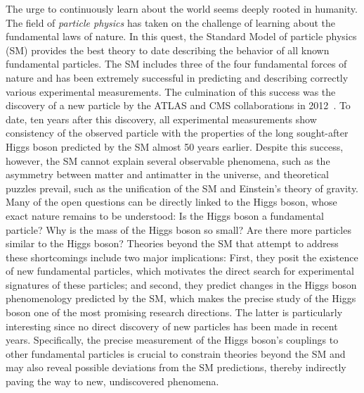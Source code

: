 
The urge to continuously learn about the world seems deeply rooted in humanity.
The field of \emph{particle physics} has taken on the challenge of learning about the fundamental laws of nature. 
In this quest, the Standard Model of particle physics (SM) provides the best theory to date describing the behavior of all known fundamental particles. 
The SM includes three of the four fundamental forces of nature and has been extremely successful in predicting and describing correctly various experimental measurements. 
The culmination of this success was the discovery of a new particle by the ATLAS and CMS collaborations in 2012~\cite{HIGG-2012-27,CMS-HIG-12-028}.
To date, ten years after this discovery, all experimental measurements show consistency of the observed particle with the properties of the long sought-after Higgs boson predicted by the SM almost 50 years earlier.
Despite this success, however, the SM cannot explain several observable phenomena, such as the asymmetry between matter and antimatter in the universe, and theoretical puzzles prevail, such as the unification of the SM and Einstein's theory of gravity.
Many of the open questions can be directly linked to the Higgs boson, whose exact nature remains to be understood: Is the Higgs boson a fundamental particle? Why is the mass of the Higgs boson so small? Are there more particles similar to the Higgs boson? 
Theories beyond the SM that attempt to address these shortcomings include two major implications: First, they posit the existence of new fundamental particles, which motivates the direct search for experimental signatures of these particles; and second, they predict changes in the Higgs boson phenomenology predicted by the SM, which makes the precise study of the Higgs boson one of the most promising research directions. The latter is particularly interesting since no direct discovery of new particles has been made in recent years. 
Specifically, the precise measurement of the Higgs boson's couplings to other fundamental particles is crucial to constrain theories beyond the SM and may also reveal possible deviations from the SM predictions, thereby indirectly paving the way to new, undiscovered phenomena. 

